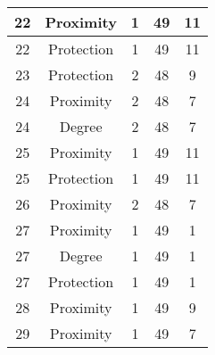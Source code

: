 \documentclass[results.tex]{subfiles}
\begin{document}
\begin{center}
\begin{tabular}{| c || c | c | c | c |}
            \hline
            22                      & Proximity                    & 1                      & 49                      & 11                   \\
            \hline
            22                      & Protection                   & 1                      & 49                      & 11                   \\
            \hline
            23                      & Protection                   & 2                      & 48                      & 9                    \\
            \hline
            24                      & Proximity                    & 2                      & 48                      & 7                    \\
            \hline
            24                      & Degree                       & 2                      & 48                      & 7                    \\
            \hline
            25                      & Proximity                    & 1                      & 49                      & 11                   \\
            \hline
            25                      & Protection                   & 1                      & 49                      & 11                   \\
            \hline
            26                      & Proximity                    & 2                      & 48                      & 7                    \\
            \hline
            27                      & Proximity                    & 1                      & 49                      & 1                    \\
            \hline
            27                      & Degree                       & 1                      & 49                      & 1                    \\
            \hline
            27                      & Protection                   & 1                      & 49                      & 1                    \\
            \hline
            28                      & Proximity                    & 1                      & 49                      & 9                    \\
            \hline
            29                      & Proximity                    & 1                      & 49                      & 7                    \\

\end{tabular}
\end{center}
\end{document}
